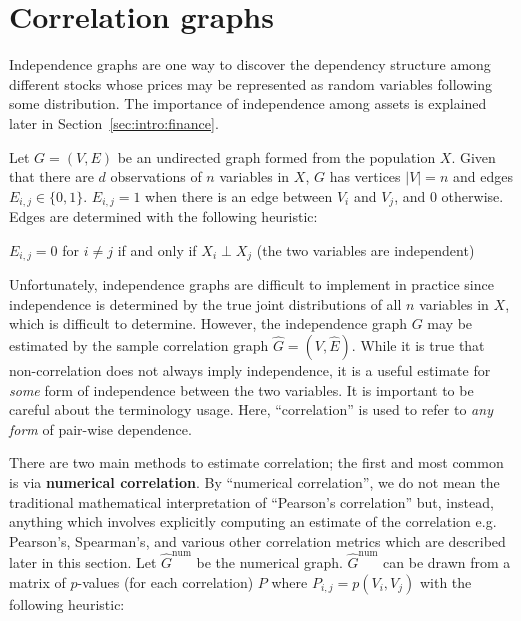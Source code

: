 \section{Correlation graphs}
\label{sec:intro:correlation}

Independence graphs are one way to discover the dependency structure among
different stocks whose prices may be represented as random variables following
some distribution. The importance of independence among assets is explained 
later in Section~\ref{sec:intro:finance}.

Let $G=(V,E)$ be an undirected graph formed from the population 
$X$. Given that there are $d$ observations of $n$ variables in $X$, 
$G$ has vertices $|V| = n$ and edges $E_{i,j}\in\{0,1\}$. 
$E_{i,j}=1$ when there is an edge between $V_i$ and $V_j$, and 0 otherwise. 
Edges are determined with the following heuristic: \\

\begin{algorithm}
	$E_{i,j} = 0$ for $i\neq j$ if and only if $X_i \perp X_j$ (the two 
	variables are independent)
\end{algorithm}

Unfortunately, independence graphs are difficult to implement in practice since 
independence is determined by the true joint distributions of all $n$ variables 
in $X$, which is difficult to determine. However, the independence graph 
$G$ may be estimated by the sample correlation graph 
$\hat{G}=(V,\hat{E})$. While it is true that non-correlation does 
not always imply independence, it is a useful estimate for \textit{some} form 
of independence between the two variables. 
It is important to be careful about the terminology usage. Here, 
``correlation'' is used to refer to \textit{any form} of pair-wise dependence. 

There are two main methods to estimate correlation; the first and most common 
is via \textbf{numerical correlation}. 
By ``numerical correlation'', we do not mean the traditional mathematical 
interpretation of ``Pearson's correlation'' but, instead, anything which 
involves explicitly computing an estimate of the correlation e.g. Pearson's, 
Spearman's, and various other correlation metrics which are described later in 
this section. 
Let $\hat{G}^{\text{num}}$ be the numerical graph. $\hat{G}^{\text{num}}$ can 
be drawn from a matrix of $p$-values (for each correlation) $P$ where 
$P_{i,j}=p(V_i,V_j)$ with the following heuristic:\\

